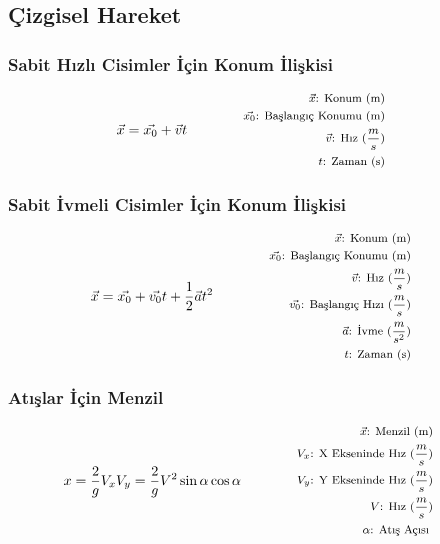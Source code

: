 \subsection{Çizgisel Hareket}

\subsubsection*{Sabit Hızlı Cisimler İçin Konum İlişkisi}
\begin{equation}
    \vec{x} = \vec{x_0} + \vec{v}t \qquad \qquad \parbox{4cm}{\footnotesize$\begin{aligned}
        \vec{x}\text{: Konum (m)} \\
        \vec{x_0}\text{: Başlangıç Konumu (m)} \\
        \vec{v}\text{: Hız } (\frac{m}{s}) \\
        t\text{: Zaman (s)}
\end{aligned}$}
\end{equation}

\subsubsection*{Sabit İvmeli Cisimler İçin Konum İlişkisi}
\begin{equation}
    \vec{x} = \vec{x_0} + \vec{v_0}t + \frac{1}{2} \vec{a} t^2 \qquad \qquad \parbox{4cm}{\footnotesize$\begin{aligned}
        \vec{x}\text{: Konum (m)} \\
        \vec{x_0}\text{: Başlangıç Konumu (m)} \\
        \vec{v}\text{: Hız } (\frac{m}{s}) \\
        \vec{v_0}\text{: Başlangıç Hızı } (\frac{m}{s}) \\
        \vec{a}\text{: İvme } (\frac{m}{s^2}) \\
        t\text{: Zaman (s)}
\end{aligned}$}
\end{equation}

\subsubsection*{Atışlar İçin Menzil}
\begin{equation}
    x = \frac{2}{g}V_x V_y = \frac{2}{g}V^2\sin{\alpha}\cos{\alpha} \qquad \qquad \parbox{4cm}{\footnotesize$\begin{aligned}
        \vec{x}\text{: Menzil (m)} \\
        V_x\text{: X Ekseninde Hız } (\frac{m}{s}) \\
        V_y\text{: Y Ekseninde Hız } (\frac{m}{s}) \\
        V\text{: Hız } (\frac{m}{s}) \\
        \alpha\text{: Atış Açısı }
\end{aligned}$}
\end{equation}

